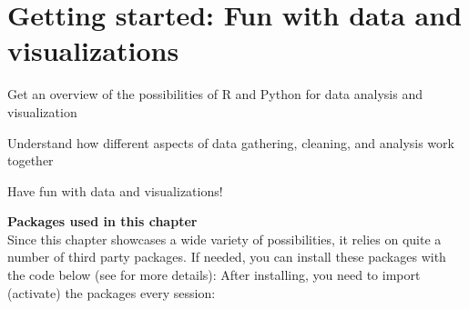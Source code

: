 \chapter{Getting started: Fun with data and visualizations}
\label{chap:fundata}

\begin{abstract}{Abstract}
  This chapter gives a lightning tour of some of the cool (and informative) things you can do with R and Python.
  Starting from a dataset of tweets about COVID-19, we show how you can analyse this data using
  text analysis, network analysis, and using geographic information.
  The goal of this chapter is not to teach you all these techniques in detail.
  Rather, each of the examples showcases a possibility and guides you to the chapter where it will be explained in more detail.
  So don't worry too much about understanding every line of code, but relax and enjoy the ride!
\end{abstract}


\begin{objectives}
\item Get an overview of the possibilities of R and Python for data analysis and visualization
\item Understand how different aspects of data gathering, cleaning, and analysis work together
\item Have fun with data and visualizations!
\end{objectives}

\newpage
\begin{feature}
  \textbf{Packages used in this chapter}\\
  Since this chapter showcases a wide variety of possibilities,
  it relies on quite a number of third party packages.
  If needed, you can install these packages with the code below
  (see  for more details):
  \noindent After installing, you need to import (activate) the packages every session:
\end{feature}




